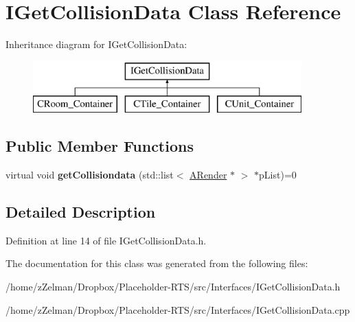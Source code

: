\hypertarget{classIGetCollisionData}{\section{I\-Get\-Collision\-Data Class Reference}
\label{classIGetCollisionData}
}
Inheritance diagram for I\-Get\-Collision\-Data\-:\begin{figure}[H]
\begin{center}
\leavevmode
\includegraphics[height=2.000000cm]{classIGetCollisionData}
\end{center}
\end{figure}
\subsection*{Public Member Functions}
\begin{DoxyCompactItemize}
\item 
\hypertarget{classIGetCollisionData_a7b25012a7b2b296670467d03f105cf78}{virtual void {\bfseries get\-Collisiondata} (std\-::list$<$ \hyperlink{classARender}{A\-Render} $\ast$ $>$ $\ast$p\-List)=0}\label{classIGetCollisionData_a7b25012a7b2b296670467d03f105cf78}

\end{DoxyCompactItemize}


\subsection{Detailed Description}


Definition at line 14 of file I\-Get\-Collision\-Data.\-h.



The documentation for this class was generated from the following files\-:\begin{DoxyCompactItemize}
\item 
/home/z\-Zelman/\-Dropbox/\-Placeholder-\/\-R\-T\-S/src/\-Interfaces/I\-Get\-Collision\-Data.\-h\item 
/home/z\-Zelman/\-Dropbox/\-Placeholder-\/\-R\-T\-S/src/\-Interfaces/I\-Get\-Collision\-Data.\-cpp\end{DoxyCompactItemize}
